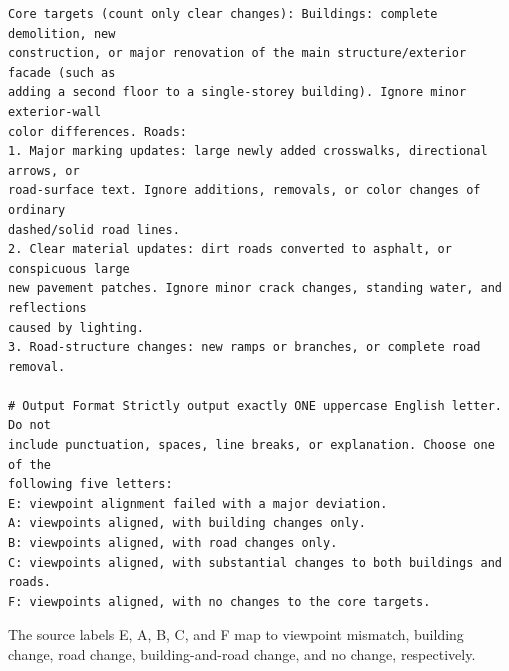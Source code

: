 \begin{promptbox}
\begin{verbatim}
Core targets (count only clear changes): Buildings: complete demolition, new
construction, or major renovation of the main structure/exterior facade (such as
adding a second floor to a single-storey building). Ignore minor exterior-wall
color differences. Roads:
1. Major marking updates: large newly added crosswalks, directional arrows, or
road-surface text. Ignore additions, removals, or color changes of ordinary
dashed/solid road lines.
2. Clear material updates: dirt roads converted to asphalt, or conspicuous large
new pavement patches. Ignore minor crack changes, standing water, and reflections
caused by lighting.
3. Road-structure changes: new ramps or branches, or complete road removal.

# Output Format Strictly output exactly ONE uppercase English letter. Do not
include punctuation, spaces, line breaks, or explanation. Choose one of the
following five letters:
E: viewpoint alignment failed with a major deviation.
A: viewpoints aligned, with building changes only.
B: viewpoints aligned, with road changes only.
C: viewpoints aligned, with substantial changes to both buildings and roads.
F: viewpoints aligned, with no changes to the core targets.
\end{verbatim}
\end{promptbox}
\endgroup

The source labels E, A, B, C, and F map to viewpoint mismatch, building change, road change, building-and-road change, and no change, respectively.

